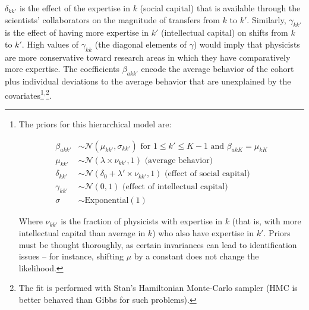 \documentclass{article}
\begin{document}
$\delta_{kk'}$ is the effect of the expertise in $k$ (social capital) that is available through the scientists' collaborators on the magnitude of transfers from $k$ to $k'$. Similarly, $\gamma_{kk'}$ is the effect of having more expertise in $k'$ (intellectual capital) on shifts from $k$ to $k'$. High values of $\gamma_{kk}$ (the diagonal elements of $\gamma$) would imply that physicists are more conservative toward research areas in which they have comparatively more expertise. The coefficients $\beta_{akk'}$ encode the average behavior of the cohort plus individual deviations to the average behavior that are unexplained by the covariates\footnote{The priors for this hierarchical model are:

\begin{align}
    \beta_{akk'} &\sim \mathcal{N}(\mu_{k k'},\sigma_{k k'}) \text{ for } 1\leq k' \leq K-1 \text{ and } \beta_{ak K} = \mu_{kK}\label{eq:beta}\\
    \mu_{k k'} &\sim \mathcal{N}(\lambda \times  \nu_{kk'},1) \text{ (average behavior)}\\
    \delta_{kk'} &\sim \mathcal{N}(\delta_0+\lambda ' \times \nu_{kk'},1) \text { (effect of social capital)}\label{eq:social_capital_nu}\\
    \gamma_{kk'} &\sim \mathcal{N}(0,1)  \text { (effect of intellectual capital)}\\
    \sigma &\sim \mathrm{Exponential}(1)
\end{align}

Where $\nu_{kk'}$ is the fraction of physicists with expertise in $k$ (that is, with more intellectual capital than average in $k$) who also have expertise in $k'$. %
Priors must be thought thoroughly, as certain invariances can lead to identification issues -- for instance, shifting $\mu$ by a constant does not change the likelihood.
}\textsuperscript{,}\footnote{The fit is performed with Stan's Hamiltonian Monte-Carlo sampler (HMC is better behaved than Gibbs for such problems).%
}. %
\end{document}
